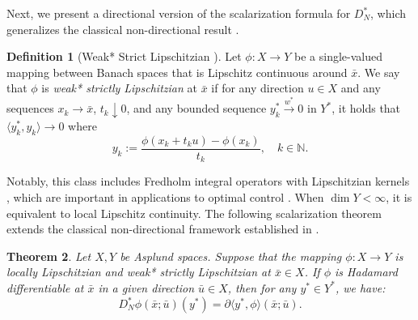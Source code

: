 \documentclass[12pt,twoside,reqno]{amsart}
\newtheorem{theorem}{Theorem}[section]
\theoremstyle{definition}
\newtheorem{definition}[theorem]{Definition}
\numberwithin{equation}{section}
\begin{document}
Next, we present a directional version of the scalarization formula for $D_N^*$, which generalizes the classical non-directional result \cite[Theorem~3.28]{Mordukhovich2006variational}. 
\begin{definition}[Weak* Strict Lipschitzian {\cite[Definition~3.25]{Mordukhovich2006variational}}] \label{defn:weak_strict_lip}
Let $\phi: X \to Y$ be a single-valued mapping between Banach spaces that is Lipschitz continuous around $\bar{x}$. We say that $\phi$ is \emph{weak* strictly Lipschitzian} at $\bar{x}$ if for any direction $u \in X$ and any sequences $x_k \to \bar{x}$, $t_k \downarrow 0$, and any bounded sequence $y_k^* \xrightarrow{w^*} 0$ in $Y^*$, it holds that $\langle y_k^*, y_k \rangle \to 0$ where
    \begin{equation*}
        y_k := \frac{\phi(x_k + t_k u) - \phi(x_k)}{t_k}, \quad k \in \mathbb{N}. 
    \end{equation*}
\end{definition}

Notably, this class includes Fredholm integral operators with Lipschitzian kernels \cite[Chap.~5]{zeidler2012applied}, which are important in applications to optimal control 
\cite[p.~288]{Mordukhovich2006variational}. When $\dim Y < \infty$, it is equivalent to local Lipschitz continuity. The following scalarization theorem extends the classical non-directional framework established in \cite[Theorem~3.28]{Mordukhovich2006variational}.  

\begin{theorem} \label{thm:scalarization}
Let $X,Y$ be Asplund spaces. Suppose that the mapping $\phi: X \to Y$ is locally Lipschitzian and weak* strictly Lipschitzian at $\bar{x} \in X$. If $\phi$ is Hadamard differentiable at $\bar{x}$ in a given direction $\bar{u} \in X$, then for any $y^* \in Y^*$, we have: 
\begin{equation} \label{eq:scalarization_formula}
    D_N^* \phi(\bar{x}; \bar{u})(y^*) = \partial \langle y^*, \phi \rangle (\bar{x}; \bar{u}).
\end{equation}
\end{theorem}
\end{document}
